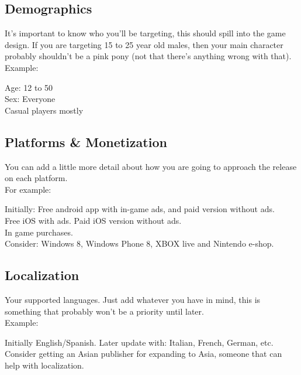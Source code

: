 \documentclass[12pt, a4paper]{article}
\begin{document}
\subsection{Demographics}
It’s important to know who you’ll be targeting, this should spill into the game design. If you are targeting 15 to 25 year old males, then your main character probably shouldn’t be a pink pony (not that there’s anything wrong with that).\\

Example:
\begin{tcolorbox}
Age: 12 to 50\\

Sex: Everyone\\

Casual players mostly\\
\end{tcolorbox}

\subsection{Platforms \& Monetization}
You can add a little more detail about how you are going to approach the release on each platform.\\

For example:
\begin{tcolorbox}
Initially: Free android app with in-game ads, and paid version without ads.\\

Free iOS with ads. Paid iOS version without ads.\\

In game purchases.\\

Consider: Windows 8, Windows Phone 8, XBOX live and Nintendo e-shop.\\
\end{tcolorbox}

\subsection{Localization}
Your supported languages. Just add whatever you have in mind, this is something that probably won’t be a priority until later.\\

Example:
\begin{tcolorbox}
Initially English/Spanish. 
Later update with: Italian, French, German, etc.\\

Consider getting an Asian publisher for expanding to Asia, someone that can help with localization.
\end{tcolorbox}
\end{document}
